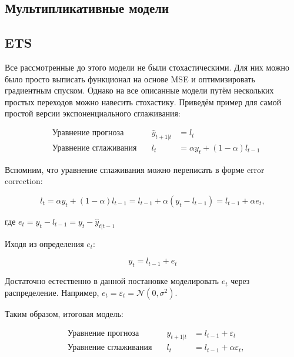 \documentclass[12pt,fleqn]{article}
\begin{document}
\subsection{Мультипликативные модели}

\subsection{ETS}

Все рассмотренные до этого модели не были стохастическими. Для них можно было просто выписать функционал на основе MSE и оптимизировать градиентным спуском. Однако на все описанные модели путём нескольких простых переходов можно навесить стохастику. Приведём пример для самой простой версии экспоненциального сглаживания:

\begin{equation}
	\begin{array}{llll}
		&\text{Уравнение прогноза} \quad & 	\hat{y}_{t+1|t}& = l_t \\
		&\text{Уравнение сглаживания}\quad & l_t& =\alpha y_t +(1-\alpha) l_{t-1}
	\end{array}
\end{equation}

Вспомним, что уравнение сглаживания можно переписать в форме error correction:

\begin{equation}
   l_t = \alpha y_t +(1-\alpha) l_{t-1} =  l_{t-1}  + \alpha (y_t - l_{t-1}) =  l_{t-1}  + \alpha e_t,
\end{equation}

где $e_t = y_t - l_{t-1} = y_t - \hat{y}_{t|t-1}$

Иходя из определения $e_t$:

\begin{equation}
y_t = l_{t-1} + e_t
\end{equation}

Достаточно естественно в данной постановке моделировать $e_t$ через распределение. Например, $e_t = \varepsilon_t = \mathcal{N}(0, \sigma^2)$.

Таким образом, итоговая модель:

\begin{equation}
	\begin{array}{llll}
		&\text{Уравнение прогноза} \quad & 	\hat{y}_{t+1|t}& = l_{t-1} + \varepsilon_t \\
		&\text{Уравнение сглаживания}\quad & l_t & = l_{t-1}  + \alpha \varepsilon_t,
	\end{array}
\end{equation}
\end{document}
